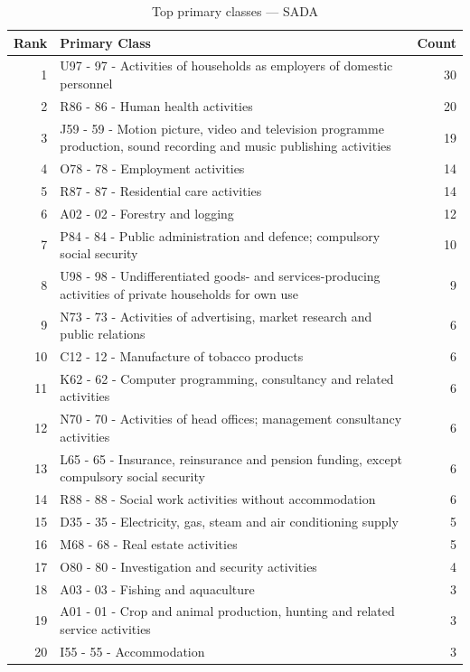 \begin{table}[H]
    \centering
    \begin{tabular}{r p{10cm} r}
    \hline
    \textbf{Rank} & \textbf{Primary Class} & \textbf{Count} \\
    \hline
    1 & U97 - 97 - Activities of households as employers of domestic personnel & 30 \\
    2 & R86 - 86 - Human health activities & 20 \\
    3 & J59 - 59 - Motion picture, video and television programme production, sound recording and music publishing activities & 19 \\
    4 & O78 - 78 - Employment activities & 14 \\
    5 & R87 - 87 - Residential care activities & 14 \\
    6 & A02 - 02 - Forestry and logging & 12 \\
    7 & P84 - 84 - Public administration and defence; compulsory social security & 10 \\
    8 & U98 - 98 - Undifferentiated goods- and services-producing activities of private households for own use & 9 \\
    9 & N73 - 73 - Activities of advertising, market research and public relations & 6 \\
    10 & C12 - 12 - Manufacture of tobacco products & 6 \\
    11 & K62 - 62 - Computer programming, consultancy and related activities & 6 \\
    12 & N70 - 70 - Activities of head offices; management consultancy activities & 6 \\
    13 & L65 - 65 - Insurance, reinsurance and pension funding, except compulsory social security & 6 \\
    14 & R88 - 88 - Social work activities without accommodation & 6 \\
    15 & D35 - 35 - Electricity, gas, steam and air conditioning supply & 5 \\
    16 & M68 - 68 - Real estate activities & 5 \\
    17 & O80 - 80 - Investigation and security activities & 4 \\
    18 & A03 - 03 - Fishing and aquaculture & 3 \\
    19 & A01 - 01 - Crop and animal production, hunting and related service activities & 3 \\
    20 & I55 - 55 - Accommodation & 3 \\
    \hline
    \end{tabular}
    \caption{Top primary classes --- SADA}
\end{table}


